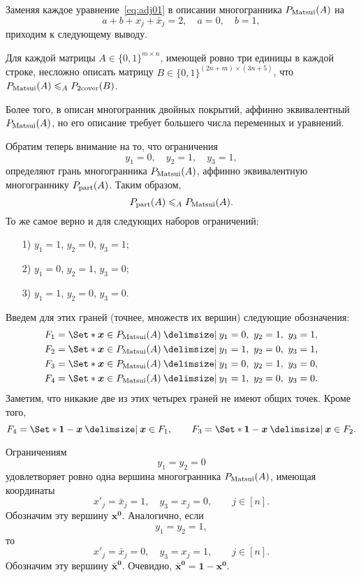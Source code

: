 Заменяя каждое уравнение~\eqref{eq:adj01} в описании многогранника $P_{\textup{Matsui}}(A)$ на 
\[
a + b + x_j + \bar{x}_j = 2, \quad a = 0, \quad b = 1,
\]
приходим к следующему выводу.

\begin{prop}
Для каждой матрицы $A \in \{0,1\}^{m\times n}$, имеющей ровно три единицы в каждой строке, несложно описать матрицу $B \in \{0,1\}^{(2n+m)\times(3n+5)}$,
что $P_{\textup{Matsui}}(A) \leqslant_A P_{\textup{2cover}}(B)$.
\end{prop}	

Более того, в \cite{Matsui:1995} описан многогранник двойных покрытий, аффинно
эквивалентный $P_{\textup{Matsui}}(A)$, но его описание требует большего числа переменных и
уравнений.

Обратим теперь внимание на то, что ограничения 
\[
y_1 = 0, \quad y_2 = 1, \quad y_3 = 1,
\]
определяют грань многогранника $P_{\textup{Matsui}}(A)$, аффинно эквивалентную многограннику $P_{\textup{part}}(A)$.
Таким образом,
\begin{equation}
\label{eq:PartNPadj}
P_{\textup{part}}(A) \leqslant_A P_{\textup{Matsui}}(A).
\end{equation}	
То же самое верно и для следующих наборов ограничений:
\begin{enumerate}
\item[1)] $y_1 = 1$, $y_2 = 0$, $y_3 = 1$;
\item[2)] $y_1 = 0$, $y_2 = 1$, $y_3 = 0$;
\item[3)] $y_1 = 1$, $y_2 = 0$, $y_3 = 0$.
\end{enumerate}
Введем для этих граней (точнее, множеств их вершин) следующие обозначения:
\begin{align*}
F_1 &= \Set*{\bm{x}\in \NPadj(A) \given y_1 = 0, \ y_2 = 1, \ y_3 = 1}, \\
F_2 &= \Set*{\bm{x}\in \NPadj(A) \given y_1 = 1, \ y_2 = 0, \ y_3 = 1}, \\
F_3 &= \Set*{\bm{x}\in \NPadj(A) \given y_1 = 0, \ y_2 = 1, \ y_3 = 0}, \\
F_4 &= \Set*{\bm{x}\in \NPadj(A) \given y_1 = 1, \ y_2 = 0, \ y_3 = 0}.
\end{align*}
Заметим, что никакие две из этих четырех граней не имеют общих точек.
Кроме того,
\begin{equation}
\label{eq:F4F3}
F_4 = \Set*{\bm{1} - \bm{x} \given \bm{x} \in F_1}, \qquad
F_3 = \Set*{\bm{1} - \bm{x} \given \bm{x} \in F_2}.
\end{equation}

Ограничениям
\[
y_1 = y_2 = 0
\]
удовлетворяет ровно одна вершина многогранника $P_{\textup{Matsui}}(A)$, имеющая координаты
\[
x'_j = \bar{x}_j = 1, \quad y_3 = x_j = 0, \qquad j\in[n].
\]
Обозначим эту вершину $\bm{x^0}$.
Аналогично, если 
\[
y_1 = y_2 = 1,
\]
то 
\[
x'_j = \bar{x}_j = 0, \quad y_3 = x_j = 1, \qquad j\in[n].
\]
Обозначим эту вершину $\bm{\bar{x}^0}$.
Очевидно, $\bm{\bar{x}^0} = \bm{1} - \bm{x^0}$.

